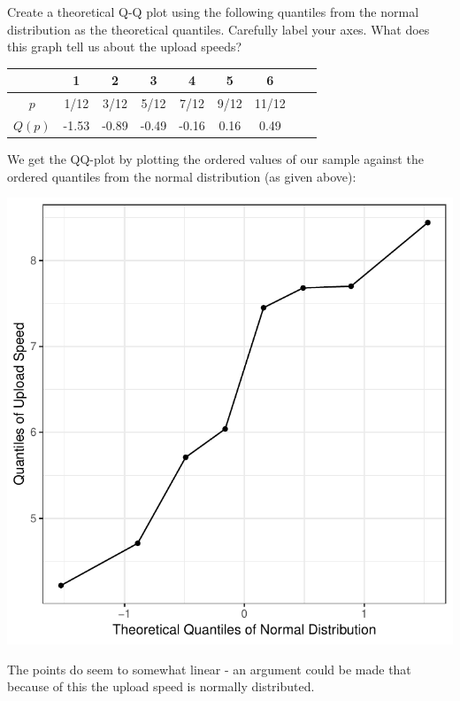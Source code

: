 \documentclass{examsetup}\usepackage[]{graphicx}\usepackage[]{color}
\newenvironment{knitrout}{}{} %
\begin{document}
\begin{questions}
\begin{parts}
Create a theoretical Q-Q plot using the following quantiles from the normal distribution as the theoretical quantiles. Carefully label your axes.
What does this graph tell us about the upload speeds?

\begin{table}[h!]
   \centering
   \begin{tabular}{ccccccccc}
             & 1 & 2 & 3 & 4 & 5 & 6 \\ \hline
      $p$    & 1/12 & 3/12 & 5/12 & 7/12 & 9/12 & 11/12 \\
      $Q(p)$ & -1.53 & -0.89 & -0.49 & -0.16 & 0.16 & 0.49 \\ \hline
   \end{tabular}
\end{table}

\begin{solution}
   We get the QQ-plot by plotting the ordered values of our sample against the ordered quantiles from the normal distribution (as given above): \\

\begin{centering}
\begin{knitrout}
\color{fgcolor}
\includegraphics[width=.5\linewidth]{figure/unnamed-chunk-11-1} 

\end{knitrout}
\end{centering}

The points do seem to somewhat linear - an argument could be made that because of this the upload speed is normally distributed.

\end{solution}

\end{parts}

\pagebreak


\end{questions}
\end{document}

